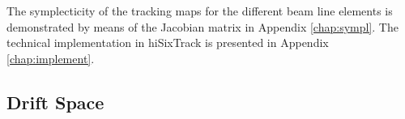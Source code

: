 The symplecticity of the tracking maps for the different beam line elements is demonstrated by means of the Jacobian matrix in Appendix \ref{chap:sympl}. The technical implementation in hiSixTrack is presented in Appendix \ref{chap:implement}. 
%
%
\subsection{Drift Space}


